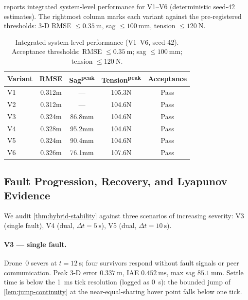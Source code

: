  reports integrated system-level performance for V1--V6 (deterministic seed-42 estimates). The rightmost column marks each variant against the pre-registered thresholds: 3-D RMSE $\le \SI{0.35}{\metre}$, sag $\le \SI{100}{\milli\metre}$, tension $\le \SI{120}{\newton}$.

\begin{table}[htbp]
  \caption{Integrated system-level performance (V1--V6, seed-42). Acceptance thresholds: RMSE $\le \SI{0.35}{\metre}$; sag $\le \SI{100}{\milli\metre}$; tension $\le \SI{120}{\newton}$.}
  \label{tab:performance-ci}
  \centering
  \small
  \renewcommand{\arraystretch}{1.05}
  \begin{tabular}{lcccc}
    \toprule
    Variant & RMSE & Sag\textsuperscript{peak}
            & Tension\textsuperscript{peak} & Acceptance \\
    \midrule
    V1 & 0.312m & ---  & 105.3N & Pass \\
    V2 & 0.312m & ---  & 104.6N & Pass \\
    V3 & 0.324m & 86.8mm & 104.6N & Pass \\
    V4 & 0.328m & 95.2mm & 104.6N & Pass \\
    V5 & 0.324m & 90.4mm & 104.6N & Pass \\
    V6 & 0.326m & 76.1mm & 107.6N & Pass \\
    \bottomrule
  \end{tabular}
\end{table}

\subsection{Fault Progression, Recovery, and Lyapunov Evidence}
\label{sec:VI-C}

We audit \cref{thm:hybrid-stability} against three scenarios of increasing severity: V3 (single fault), V4 (dual, $\Delta t = \SI{5}{\second}$), V5 (dual, $\Delta t = \SI{10}{\second}$).

\paragraph{V3 --- single fault.} Drone~0 severs at $t = \SI{12}{\second}$; four survivors respond without fault signals or peer communication. Peak 3-D error $\SI{0.337}{\metre}$, IAE $\SI{0.452}{\metre\second}$, max sag $\SI{85.1}{\milli\metre}$. Settle time is below the \SI{1}{\milli\second} tick resolution (logged as 0~s): the bounded jump of \cref{lem:jump-continuity} at the near-equal-sharing hover point falls below one tick.

